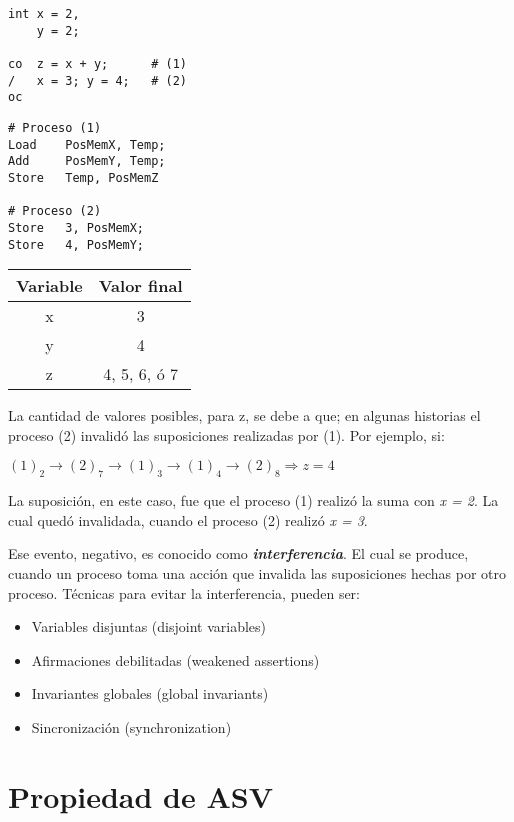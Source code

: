 \documentclass[a4paper, 10pt]{report}
\begin{document}
\begin{multicols}{3}
\begin{lstlisting}
int x = 2,
    y = 2;

co  z = x + y;      # (1)
/   x = 3; y = 4;   # (2)
oc
\end{lstlisting}
\columnbreak
\begin{lstlisting}
# Proceso (1)
Load    PosMemX, Temp;
Add     PosMemY, Temp;
Store   Temp, PosMemZ

# Proceso (2)
Store   3, PosMemX;
Store   4, PosMemY;
\end{lstlisting}
\columnbreak
    {\renewcommand{\arraystretch}{1.5}%
    \centering
    \begin{tabular}{cc}
        \textbf{Variable} & \textbf{Valor final}\\
        \hline 
        x & 3\\ 
        y & 4\\ 
        z & 4, 5, 6, ó 7\\
    \end{tabular}}
\end{multicols}


La cantidad de valores posibles, para z, se debe a que; en algunas historias el proceso (2) invalidó las suposiciones realizadas por (1). Por ejemplo, si:

\centerline{$(1)_2 \rightarrow (2)_7 \rightarrow (1)_3 \rightarrow (1)_4 \rightarrow (2)_8 \Rightarrow z = 4$}

La suposición, en este caso, fue que el proceso (1) realizó la suma con \emph{x = 2}. La cual quedó invalidada, cuando el proceso (2) realizó \emph{x = 3}. 

Ese evento, negativo, es conocido como \textbf{\emph{interferencia}}. El cual se produce, cuando un proceso toma una acción que invalida las suposiciones hechas por otro proceso. Técnicas para evitar la interferencia, pueden ser:

\begin{itemize}
    \item Variables disjuntas (disjoint variables)
    \item Afirmaciones debilitadas (weakened assertions)
    \item Invariantes globales (global invariants)
    \item Sincronización (synchronization)
\end{itemize}

\section{Propiedad de ASV}
\end{document}
